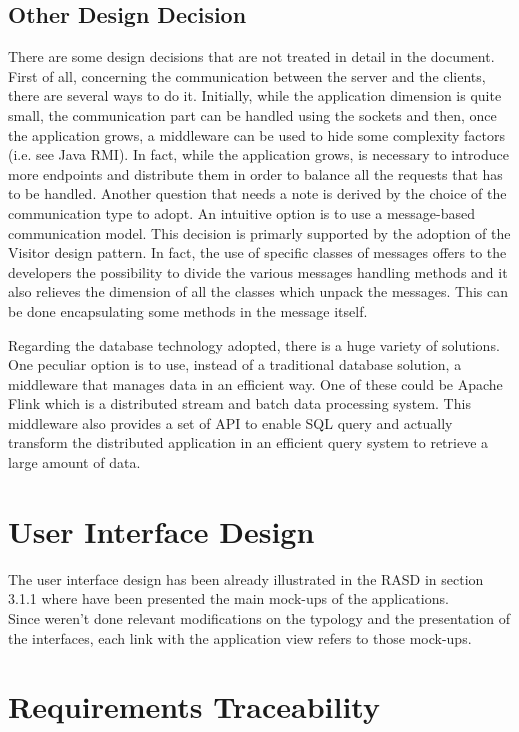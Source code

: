 \documentclass[a4paper]{article}
\begin{document}
\subsection{Other Design Decision}
There are some design decisions that are not treated in detail in the document. 
First of all, concerning the communication between the server and the clients, there are several ways to do it. 
Initially, while the application dimension is quite small, the communication part can be handled using the sockets and then, once the application grows, a middleware can be used to hide some complexity factors (i.e. see Java RMI).
In fact, while the application grows, is necessary to introduce more endpoints and distribute them in order to balance all the requests that has to be handled.
Another question that needs a note is derived by the choice of the communication type to adopt.
An intuitive option is to use a message-based communication model.
This decision is primarly supported by the adoption of the Visitor design pattern. 
In fact, the use of specific classes of messages offers to the developers the possibility to divide the various messages handling methods and it also relieves the dimension of all the classes which unpack the messages. 
This can be done encapsulating some methods in the message itself.

Regarding the database technology adopted, there is a huge variety of solutions.
One peculiar option is to use, instead of a traditional database solution, a middleware that manages data in an efficient way.
One of these could be Apache Flink which is a distributed stream and batch data processing system. This middleware also provides a set of API to enable SQL query and actually transform the distributed application in an efficient query system to retrieve a large amount of data.
\clearpage

\section{User Interface Design}
The user interface design has been already illustrated in the RASD in section 3.1.1 where have been presented the main mock-ups of the applications.\\
Since weren't done relevant modifications on the typology and the presentation of the interfaces, each link with the application view refers to those mock-ups. 
\clearpage

\section{Requirements Traceability}
\end{document}
